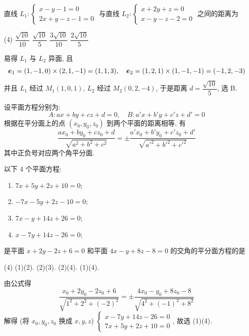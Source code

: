 \begin{example}
    直线 $L_1:\begin{cases}
            x-y-1=0 \\ 2x+y-z-1=0
        \end{cases}$ 与直线 $L_2:\begin{cases}
            x+2y+z=0 \\ x-y-z-2=0
        \end{cases}$ 之间的距离为
    \begin{tasks}(4)
        \task $\dfrac{\sqrt{10}}{10}$
        \task $\dfrac{\sqrt{10}}{5}$
        \task $\dfrac{3\sqrt{10}}{10}$
        \task $\dfrac{2\sqrt{10}}{5}$
    \end{tasks}
\end{example}
\begin{solution}
    易得 $L_1$ 与 $L_2$ 异面, 且 $$\vb*{e}_1=(1,-1,0)\times(2,1,-1)=(1,1,3), \quad \vb*{e}_2=(1,2,1)\times(1,-1,-1)=(-1,2,-3)$$
    并且 $L_1$ 经过 $M_1(1,0,1)$, $L_2$ 经过 $M_2(0,2,-4)$, 于是距离 $d=\dfrac{\sqrt{10}}{5}$, 选 B.
\end{solution}

\begin{theorem}[角平分面]
    设平面方程分别为:
    $$
    A:ax+by+cz+d=0,\quad B:a'x+b'y+c'z+d'=0
    $$
    根据在平分面上的点 $(x_0,y_0,z_0)$ 到两个平面的距离相等, 有 
    $$
    \dfrac{ax_0+by_0+cz_0+d}{\sqrt{a^2+b^2+c^2}}=\pm \dfrac{a'x_0+b'y_0+c'z_0+d'}{\sqrt{a'^2+b'^2+c'^2}}
    $$
    其中正负号对应两个角平分面.
\end{theorem}

\begin{example}
    以下 4 个平面方程:
    \begin{enumerate}[label=(\arabic{*})]
        \item $7x+5y+2z+10=0$;
        \item $-7x-5y+2z-10=0$;
        \item $7x-y+14z+26=0$;
        \item $x-7y+14z-26=0$;
    \end{enumerate}
    是平面 $x+2y-2z+6=0$ 和平面 $4x-y+8z-8=0$ 的交角的平分面方程的是
    \begin{tasks}(4)
        \task (1)(2).
        \task (2)(3).
        \task (2)(4).
        \task (1)(4).
    \end{tasks}
\end{example}
\begin{solution}
    由公式得 $$
    \dfrac{x_0+2y_0-2z_0+6}{\sqrt{1^2+2^2+(-2)^2}}=\pm \dfrac{4x_0-y_0+8z_0-8}{\sqrt{4^2+(-1)^2+8^2}}
    $$
    解得 (将 $x_0,y_0,z_0$ 换成 $x,y,z$) $\begin{cases}
        x-7y+14z-26=0\\ 7x+5y+2z+10=0
    \end{cases}$, 故选 (1)(4).
\end{solution}

